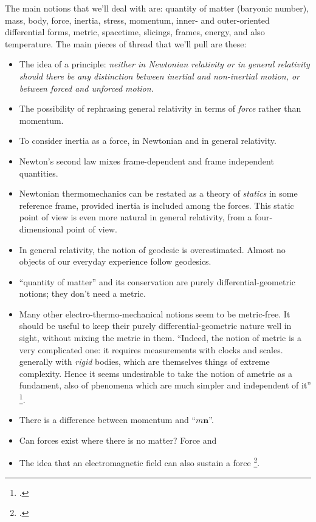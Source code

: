 \documentclass[\ifafour a4paper,12pt,\else a5paper,10pt,\fi%
onecolumn,oneside,article,%
british%
]{memoir}
\theoremstyle{remark}
\theoremstyle{innote}
\newcommand*{\citep}{\footcites}%
\renewcommand*{\|}{\nonscript\,\vert\nonscript\;\mathopen{}}
\newcommand*{\sect}{\S}%
\newcommand*{\yvv}{n}
\newcommand*{\yv}{\bm{\yvv}}
\begin{document}
The main notions that we'll deal with are: quantity of matter (baryonic
number), mass, body, force, inertia, stress, momentum, inner- and
outer-oriented differential forms, metric, spacetime, slicings, frames,
energy, and also temperature. The main pieces of thread that we'll pull are
these:
\begin{itemize}
\item The idea of a principle: \emph{neither in Newtonian relativity or in
    general relativity should there be any distinction between inertial and
    non-inertial motion, or between forced and unforced motion}.
\item The possibility of rephrasing general relativity in terms of
  \emph{force} rather than momentum.
\item To consider inertia as a force, in Newtonian and in general
  relativity.
\item Newton's second law mixes frame-dependent and frame independent
  quantities.
\item Newtonian thermomechanics can be restated as a theory of
  \emph{statics} in some reference frame, provided inertia is included
  among the forces. This static point of view is even more natural in
  general relativity, from a four-dimensional point of view.
\item In general relativity, the notion of geodesic is overestimated.
  Almost no objects of our everyday experience follow geodesics.
\item \enquote{quantity of matter} and its conservation are purely
  differential-geometric notions; they don't need a metric.
\item Many other electro-thermo-mechanical notions seem to be metric-free.
  It should be useful to keep their purely differential-geometric nature
  well in sight, without mixing the metric in them. \enquote{Indeed, the
    notion of metric is a very complicated one: it requires measurements
    with clocks and scales. generally with \emph{rigid} bodies, which are
    themselves things of extreme complexity. Hence it seems undesirable to
    take the notion of ametrie as a fundament, also of phenomena which are
    much simpler and independent of it} \citep[\sect~1,
  pp.~521--522]{vandantzig1934b}.
\item There is a difference between momentum and \enquote{$m\yv$}.
\item Can forces exist where there is no matter? Force and
\item The idea that an electromagnetic field can also sustain a force
  \citep[\sect~158, pp.~534--535]{page1928_r1958}{ericksen2007}.
\end{itemize}
\end{document}
